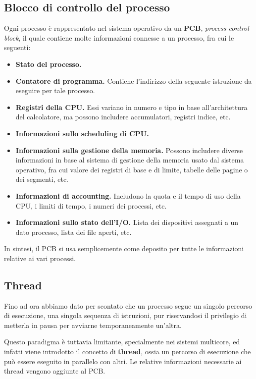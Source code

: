     \subsection{Blocco di controllo del processo}
        Ogni processo è rappresentato nel sistema operativo da un \textbf{PCB}, \textit{process control block}, il quale contiene molte informazioni connesse a un processo, fra cui le seguenti:
        \begin{itemize}
            \item \textbf{Stato del processo.}
            \item \textbf{Contatore di programma.} Contiene l'indirizzo della seguente istruzione da eseguire per tale processo.
            \item \textbf{Registri della CPU.} Essi variano in numero e tipo in base all'architettura del calcolatore, ma possono includere accumulatori, registri indice, etc.
            \item \textbf{Informazioni sullo scheduling di CPU.}
            \item \textbf{Informazioni sulla gestione della memoria.} Possono includere diverse informazioni in base al sistema di gestione della memoria usato dal sistema operativo, fra cui valore dei registri di base e di limite, tabelle delle pagine o dei segmenti, etc.
            \item \textbf{Informazioni di accounting.} Includono la quota e il tempo di uso della CPU, i limiti di tempo, i numeri dei processi, etc.
            \item \textbf{Informazioni sullo stato dell'I/O.} Lista dei dispositivi assegnati a un dato processo, lista dei file aperti, etc.
        \end{itemize}
        
        In sintesi, il PCB si usa semplicemente come deposito per tutte le informazioni relative ai vari processi.
        
    \subsection{Thread}
        Fino ad ora abbiamo dato per scontato che un processo segue un singolo percorso di esecuzione, una singola sequenza di istruzioni, pur riservandosi il privilegio di metterla in pausa per avviarne temporaneamente un'altra.
        
        Questo paradigma è tuttavia limitante, specialmente nei sistemi multicore, ed infatti viene introdotto il concetto di \textbf{thread}, ossia un percorso di esecuzione che può essere eseguito in parallelo con altri. Le relative informazioni necessarie ai thread vengono aggiunte al PCB.
        
